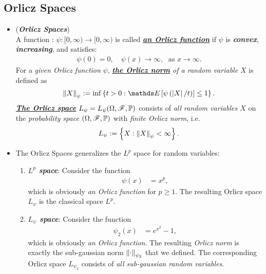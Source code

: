 \documentclass[11pt]{article}
\begin{document}
\subsection{Orlicz Spaces}
\begin{itemize}
\item \begin{definition}(\textbf{\emph{Orlicz Spaces}}) \citep{vershynin2018high}\\
A function : $\psi: [0, \infty) \to [0, \infty)$ is called \underline{\emph{\textbf{an Orlicz function}}} if $\psi$ is \emph{\textbf{convex}}, \emph{\textbf{increasing}}, and satisfies:
\begin{align*}
\psi(0) = 0, \quad \psi(x) \to \infty, \;\text{ as }x\to \infty.
\end{align*}
For a \emph{given Orlicz function} $\psi$, \emph{\underline{\textbf{the Orlicz norm}} of a random variable $X$} is defined as
\begin{align*}
\norm{X}{\psi} := \inf\set{t>0: \E{}{\psi\paren{\abs{X}/t}} \le 1}.
\end{align*}
\underline{\emph{\textbf{The Orlicz space}}} $L_{\psi} = L_{\psi}(\Omega, {\mathscr F}, {\mathbb P})$ consists of \emph{all random variables $X$} on the \emph{probability space} $(\Omega, {\mathscr F}, {\mathbb P})$ with \emph{finite Orlicz norm}, i.e.
\begin{align*}
L_{\psi} := \left\{X: \left\|X\right\|_{\psi} < \infty\right\}.
\end{align*}
\end{definition}

\item \begin{example}
The Orlicz Spaces generalizes the $L^p$ space for random variables:
\begin{enumerate}
\item \emph{\textbf{$L^p$ space}}:  Consider the function
\begin{align*}
\psi(x) &= x^{p},
\end{align*} which is obviously \emph{an Orlicz function} for $p \ge 1$. The resulting Orlicz space $L_{\psi}$ is the classical space $L^p$.

\item \emph{\textbf{$L_{\psi}$ space}}:  Consider the function
\begin{align*}
\psi_2(x) &= e^{x^2} - 1,
\end{align*} which is obviously \emph{an Orlicz function}. The resulting \emph{Orlicz norm} is exactly the sub-gaussian norm $\left\|\cdot\right\|_{\psi_2}$ that we defined. The corresponding Orlicz space $L_{\psi_2}$ consists of \emph{all sub-gaussian random variables}.
\end{enumerate}
\end{example}


\end{itemize}
\end{document}
